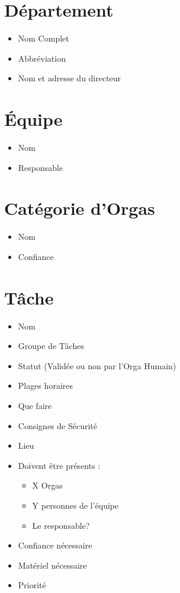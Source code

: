 \section{Département}
\begin{itemize}
 \item Nom Complet
\item Abbréviation
\item Nom et adresse du directeur

\end{itemize}

\section{Équipe}
\begin{itemize}
 \item Nom
\item Responsable

\end{itemize}



\section{Catégorie d'Orgas}
\begin{itemize}
 \item Nom
\item Confiance

\end{itemize}

\section{Tâche}
\begin{itemize}
 \item Nom
\item Groupe de Tâches
\item Statut (Validée ou non par l'Orga Humain)
\item Plages horaires 
\item Que faire
\item Consignes de Sécurité
\item Lieu

\item Doivent être présents : \begin{itemize}
                               \item X Orgas
                               \item Y personnes de l'équipe
			       \item Le responsable?
                              \end{itemize}
\item Confiance nécessaire
\item Matériel nécessaire
\item Priorité

\end{itemize}


